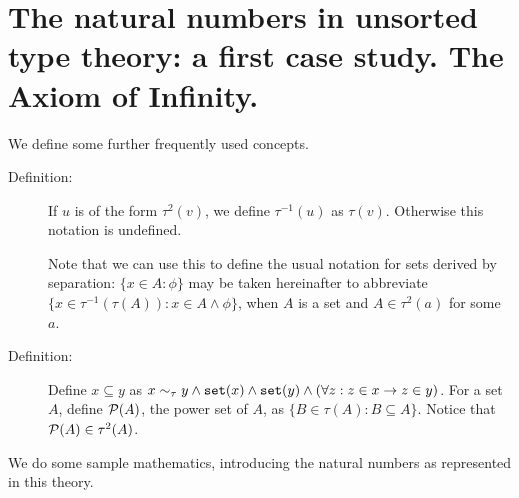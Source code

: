 \documentclass[12pt]{article}
\begin{document}
\newpage

\section{The natural numbers in unsorted type theory:  a first case study.  The Axiom of Infinity.}

We define some further frequently used concepts.

\begin{description}

\item[Definition:]  If $u$ is of the form $\tau^2(v)$, we define $\tau^{-1}(u)$ as $\tau(v)$.  Otherwise this notation is undefined.

Note that we can use this to define the usual notation for sets derived by separation:  $\{x \in A : \phi\}$
may be taken hereinafter to abbreviate $\{x \in \tau^{-1}(\tau(A)):x \in A \wedge \phi\}$, when $A$ is a set and $A \in \tau^2(a)$ for some $a$.

\item[Definition:]  Define $x \subseteq y$ as $x \sim_\tau y \wedge{\tt set}(x) \wedge {\tt set}(y) \wedge (\forall z:z \in x \rightarrow z \in y)$.  For a set $A$,
define ${\cal P}(A)$, the power set of $A$, as $\{B \in \tau(A):B \subseteq A\}$.  Notice that ${\cal P}(A) \in \tau^2(A)$.

\end{description}

We do some sample mathematics, introducing the natural numbers as represented in this theory.
\end{document}
